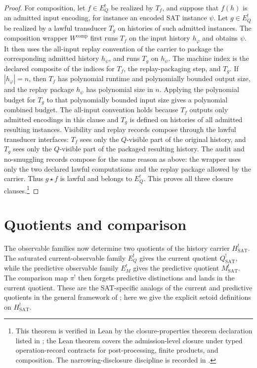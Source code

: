 \documentclass[11pt]{article}
\newcommand{\Hsat}{H^{!}_{\mathrm{SAT}}}
\newcommand{\EQbang}{E^{!}_{Q}}
\newcommand{\EMbang}{E^{!}_{M}}
\newcommand{\Qsat}{Q^{!}_{\mathrm{SAT}}}
\newcommand{\Msat}{M^{!}_{\mathrm{SAT}}}
\newcommand{\ComparisonMap}{\pi^{!}}
\theoremstyle{definition}
\begin{document}
\begin{proof}
For composition, let \(f\in\EQbang\) be realized by \(T_f\), and
suppose that \(f(h)\) is an admitted input encoding, for instance an
encoded SAT instance \(\psi\).  Let \(g\in\EQbang\) be realized by a
lawful transducer \(T_g\) on histories of such admitted instances.
The composition wrapper \(W^{\mathrm{comp}}\) first runs \(T_f\) on
the input history \(h_\varphi\) and obtains \(\psi\).  It then uses
the all-input replay convention of the carrier to package the
corresponding admitted history \(h_\psi\), and runs \(T_g\) on
\(h_\psi\).  The machine index is the declared composite of the
indices for \(T_f\), the replay-packaging step, and \(T_g\).  If
\(|h_\varphi|=n\), then \(T_f\) has polynomial runtime and polynomially
bounded output size, and the replay package \(h_\psi\) has polynomial
size in \(n\).  Applying the polynomial budget for \(T_g\) to that
polynomially bounded input size gives a polynomial combined budget.
The all-input convention holds because \(T_f\) outputs only admitted
encodings in this clause and \(T_g\) is defined on histories of all
admitted resulting instances.  Visibility and replay records compose
through the lawful transducer interfaces: \(T_f\) sees only the
\(Q\)-visible part of the original history, and \(T_g\) sees only the
\(Q\)-visible part of the packaged resulting history.  The audit and
no-smuggling records compose for the same reason as above: the wrapper
uses only the two declared lawful computations and the replay package
allowed by the carrier.  Thus \(g\star f\) is lawful and belongs to
\(\EQbang\).  This proves all three closure clauses.\footnote{This
theorem is verified in Lean by the closure-properties theorem
declaration listed in ; the Lean theorem covers
the admission-level closure under typed operation-record contracts for
post-processing, finite products, and composition.  The
narrowing-disclosure discipline is recorded in
.}
\end{proof}
 

\section{Quotients and comparison}
\label{sec:quotients}

The observable families now determine two quotients of the history
carrier \(\Hsat\).  The saturated current-observable family
\(\EQbang\) gives the current quotient \(\Qsat\), while the predictive
observable family \(\EMbang\) gives the predictive quotient \(\Msat\).
The comparison map \(\ComparisonMap\) then forgets predictive
distinctions and lands in the current quotient.  These are the
SAT-specific analogs of the current and predictive quotients in the
general framework of \citet{TsiokosHiddenness2026}; here we give the
explicit setoid definitions on \(\Hsat\).
\end{document}

